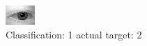 \begin{figure}[h!]
\begin{center}
\includegraphics[width=0.60\columnwidth]{figures/ID368_class_1_target_2.png}
\end{center}
\caption{ Classification: 1 actual target: 2}
\label{fig:ID368_class_1_target_2}
\end{figure}
